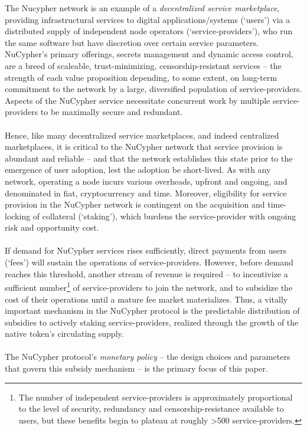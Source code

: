 \documentclass[longbibliography,nofootinbib]{revtex4-1}
\begin{document}
The Nucypher network is an example of a \textit{decentralized service marketplace}, providing infrastructural services to digital applications/systems (`users') via a distributed supply of independent node operators (`service-providers'), who run the same software but have discretion over certain service parameters. NuCypher's primary offerings, secrets management and dynamic access control, are a breed of scaleable, trust-minimizing, censorship-resistant services – the strength of each value proposition depending, to some extent, on long-term commitment to the network by a large, diversified population of service-providers. Aspects of the NuCypher service necessitate concurrent work by multiple service-providers to be maximally secure and redundant.
\\\\
Hence, like many decentralized service marketplaces, and indeed centralized marketplaces, it is critical to the NuCypher network that service provision is abundant and reliable – and that the network establishes this state prior to the emergence of user adoption, lest the adoption be short-lived. As with any network, operating a node incurs various overheads, upfront and ongoing, and denominated in fiat, cryptocurrency and time. Moreover, eligibility for service provision in the NuCypher network is contingent on the acquisition and time-locking of collateral (`staking'), which burdens the service-provider with ongoing risk and opportunity cost.
\\\\
If demand for NuCypher services rises sufficiently, direct payments from users (`fees') will sustain the operations of service-providers. However, before demand reaches this threshold, another stream of revenue is required – to incentivize a sufficient number\footnote[1]{The number of independent service-providers is approximately proportional to the level of security, redundancy and censorship-resistance available to users, but these benefits begin to plateau at roughly >500 service-providers.} of service-providers to join the network, and to subsidize the cost of their operations until a mature fee market materializes. Thus, a vitally important mechanism in the NuCypher protocol is the predictable distribution of subsidies to actively staking service-providers, realized through the growth of the native token's circulating supply. 
\\\\
The NuCypher protocol's \textit{monetary policy} – the design choices and parameters that govern this subsidy mechanism – is the primary focus of this paper. 
\end{document}
